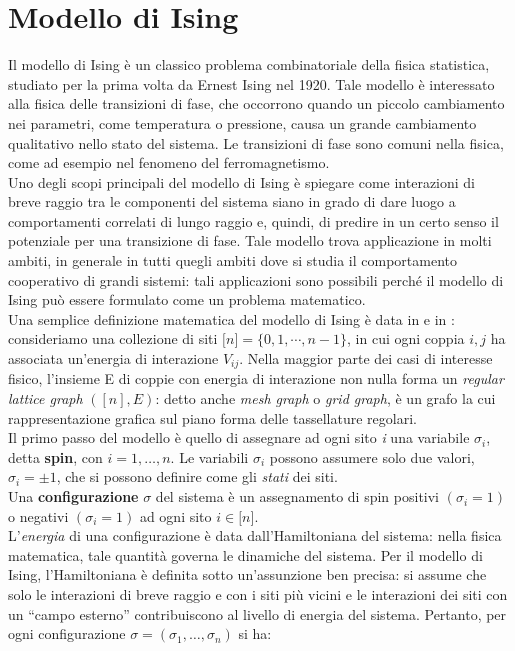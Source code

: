 \section{Modello di Ising}
Il modello di Ising è un classico problema combinatoriale della fisica statistica, studiato per la prima volta da Ernest Ising nel 1920. Tale modello è interessato alla fisica delle transizioni di fase, che occorrono quando un piccolo cambiamento nei parametri, come temperatura o pressione, causa un grande cambiamento qualitativo nello stato del sistema. Le transizioni di fase sono comuni nella fisica, come ad esempio nel fenomeno del ferromagnetismo.\\
Uno degli scopi principali del modello di Ising è spiegare come interazioni di breve raggio tra le componenti del sistema siano in grado di dare luogo a comportamenti correlati di lungo raggio e, quindi, di predire in un certo senso il potenziale per una transizione di fase. Tale modello trova applicazione in molti ambiti, in generale in tutti quegli ambiti dove si studia il comportamento cooperativo di grandi sistemi: tali applicazioni sono possibili perché il modello di Ising può essere formulato come un problema matematico.\\
Una semplice definizione matematica del modello di Ising è data in \cite{cipra1987introduction} e in \cite{jerrum1993polynomial}: consideriamo una collezione di siti $\lbrack n \rbrack = \lbrace 0, 1, \cdots, n-1 \rbrace$, in cui ogni coppia $i, j$ ha associata un’energia di interazione $V_{ij}$. Nella maggior parte dei casi di interesse fisico, l’insieme E di coppie con energia di interazione non nulla forma un \textit{regular lattice graph} $([n], E)$: detto anche \textit{mesh graph} o \textit{grid graph}, è un grafo la cui rappresentazione grafica sul piano forma delle tassellature regolari.\\
Il primo passo del modello è quello di assegnare ad ogni sito \textit{i} una variabile $\sigma_i$, detta \textbf{spin}, con $i=1, \dots, n$. Le variabili $\sigma_i$ possono assumere solo due valori, $\sigma_i = \pm 1$, che si possono definire come gli \textit{stati} dei siti.\\
Una \textbf{configurazione} $\sigma$ del sistema è un assegnamento di spin positivi $\left( \sigma_i = 1 \right)$ o negativi $\left( \sigma_i = 1 \right)$ ad ogni sito $i \in \lbrack n \rbrack$.\\
L'\textit{energia} di una configurazione è data dall’Hamiltoniana del sistema: nella fisica matematica, tale quantità governa le dinamiche del sistema. Per il modello di Ising, l’Hamiltoniana è definita sotto un’assunzione ben precisa: si assume che solo le interazioni di breve raggio e con i siti più vicini e le interazioni dei siti con un ``campo esterno'' contribuiscono al livello di energia del sistema. Pertanto, per ogni configurazione $\sigma = (\sigma_1, \dots, \sigma_n)$ si ha:\\
